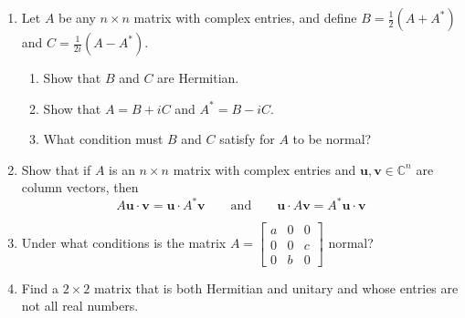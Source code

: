 \documentclass{article}
\begin{document}
\begin{enumerate}
  \item[(27)] Let $A$ be any $n\times n$ matrix with complex entries, and define
  $B = \tfrac{1}{2}(A+A^*)$ and $C = \tfrac{1}{2i}(A-A^*)$.
  \begin{enumerate}
    \item[(a)] Show that $B$ and $C$ are Hermitian.
    \item[(b)] Show that $A = B+iC$ and $A^* = B-iC$.
    \item[(c)] What condition must $B$ and $C$ satisfy for $A$ to be normal?
  \end{enumerate}

  \item[(28)] Show that if $A$ is an $n\times n$ matrix with complex entries and
  $\mathbf{u},\mathbf{v}\in\mathbb{C}^n$ are column vectors, then
  \[A\mathbf{u}\cdot\mathbf{v} = \mathbf{u}\cdot A^*\mathbf{v} \qquad\text{and}\qquad \mathbf{u}\cdot A\mathbf{v} = A^*\mathbf{u}\cdot\mathbf{v}\]

  \item[(33)] Under what conditions is the matrix
  $A = \begin{bmatrix} a & 0 & 0 \\ 0 & 0 & c \\ 0 & b & 0 \end{bmatrix}$
  normal?

  \item[(35)] Find a $2\times 2$ matrix that is both Hermitian and unitary and whose entries are not all real numbers.
\end{enumerate}
\end{document}

